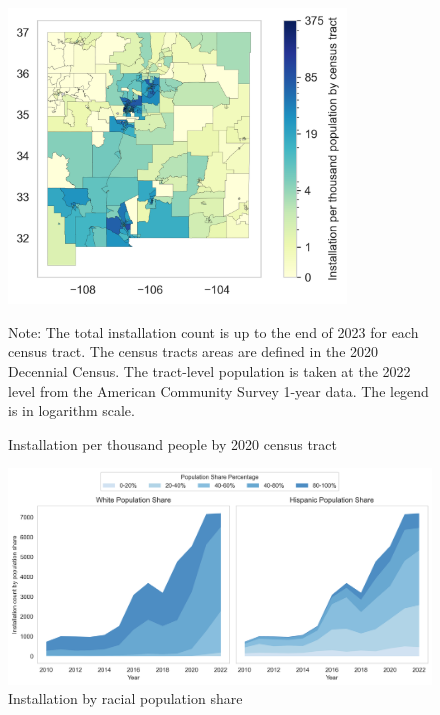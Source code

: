 \documentclass[12pt,twoside,letterpaper]{article}
\begin{document}
\begin{figure}[H]
    \centering
\includegraphics[width=0.8\textwidth]{figures/tract_count_per_kpop_map.png}
    \caption{Installation per thousand people by 2020 census tract}
    \label{fig:install_kpop}
      \begin{flushleft}
        \footnotesize Note: The total installation count is up to the end of 2023 for each census tract. The census tracts areas are defined in the 2020 Decennial Census. The tract-level population is taken at the 2022 level from the American Community Survey 1-year data. The legend is in logarithm scale. 
    \end{flushleft}
\end{figure}

\begin{figure}[!ht]
    \centering
\includegraphics[width=1\textwidth]{figures/population_quintiles.png}
    \caption{Installation by racial population share}
    \label{fig:population_quintiles}
\end{figure}
\end{document}
